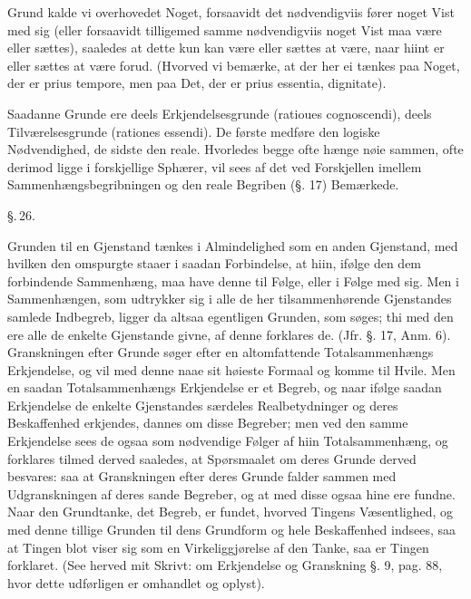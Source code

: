 \documentclass[12pt]{book}
\def\textit#1{#1}%
\def\emph#1{#1}%
\newcommand{\parag}[1]{%
  \par\vspace{0.9\baselineskip}%
  {\centering\textit{\S.\,#1.}\par}%
  \vspace{0.35\baselineskip}%
  \noindent\hspace{\parindent}\ignorespaces
}
\newcommand{\opage}[1]{\marginnote{\footnotesize\textit{[#1]}}}
\begin{document}
Grund kalde vi overhovedet Noget, forsaavidt det nødvendigviis fører noget Vist
med sig (eller forsaavidt tilligemed samme nødvendigviis noget Vist maa være
eller sættes), saaledes at dette kun kan være eller sættes at være, naar hiint
er eller sættes at være forud. (Hvorved vi bemærke, at der her ei tænkes paa
Noget, der er \textit{prius tempore}, men paa Det, der er \textit{prius
essentia, dignitate}).

Saadanne Grunde ere deels \emph{Erkjendelsesgrunde} (\textit{ratioues
cognoscendi}), deels \emph{Tilværelsesgrunde} (\textit{rationes essendi}). De
første medføre den logiske Nødvendighed, de sidste den reale. Hvorledes begge
ofte hænge nøie sammen, ofte derimod ligge i forskjellige Sphærer, vil sees af
det ved Forskjellen imellem Sammenhængsbegribningen og den reale Begriben
(§. 17) Bemærkede.

\parag{26}

Grunden til en Gjenstand tænkes i Almindelighed som en anden Gjenstand, med
hvilken den omspurgte staaer i saadan Forbindelse, at hiin, ifølge den dem
forbindende Sammenhæng, maa have denne til Følge, eller i Følge med sig. Men i
Sammenhængen, som udtrykker sig i alle de her tilsammenhørende Gjenstandes
samlede Indbegreb, ligger da altsaa egentligen Grunden, som søges; thi med den
ere alle de enkelte Gjenstande givne, af denne forklares de. (Jfr. §. 17,
Anm. 6).
\opage{73} Granskningen efter Grunde søger efter en altomfattende Totalsammenhængs
Erkjendelse, og vil med denne naae sit høieste Formaal og komme til Hvile. Men
en saadan Totalsammenhængs Erkjendelse er et Begreb, og naar ifølge saadan
Erkjendelse de enkelte Gjenstandes særdeles Realbetydninger og deres
Beskaffenhed erkjendes, dannes om disse Begreber; men ved den samme Erkjendelse
sees de ogsaa som nødvendige Følger af hiin Totalsammenhæng, og forklares
tilmed derved saaledes, at Spørsmaalet om deres Grunde derved besvares: saa at
Granskningen efter deres Grunde falder sammen med Udgranskningen af deres sande
Begreber, og at med disse ogsaa hine ere fundne. Naar den Grundtanke, det
Begreb, er fundet, hvorved Tingens Væsentlighed, og med denne tillige Grunden
til dens Grundform og hele Beskaffenhed indsees, saa at Tingen blot viser sig
som en Virkeliggjørelse af den Tanke, saa er Tingen forklaret. (See herved mit
Skrivt: om Erkjendelse og Granskning §. 9, pag. 88, hvor dette udførligen er
omhandlet og oplyst).
\end{document}
